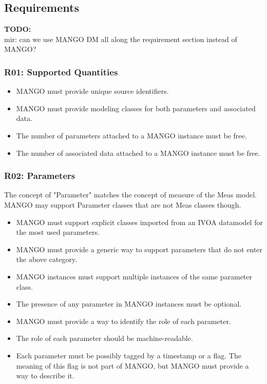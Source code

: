 \documentclass[11pt,a4paper]{ivoa}
\newcommand{\TODO}[1]{%
    \noindent%
    \colorbox{todocolor}{%
            \parbox{0.85\linewidth}{\sffamily \textbf{TODO:}\\
            #1}
    }%
    \vspace{2pt}

}
\begin{document}
\subsection{Requirements}
\TODO{mir: can we use MANGO DM all along the requirement section instead of MANGO?  }

\subsubsection{R01: Supported Quantities}
\begin{itemize}
    \item MANGO must provide unique source identifiers.
    \item MANGO must provide modeling classes for both parameters and associated data.
    \item The number of parameters attached to a MANGO instance must be free.
    \item The number of associated data attached to a MANGO instance must be free.
\end{itemize}

\subsubsection{R02: Parameters}
The concept of "Parameter" matches the concept of measure of the Meas model. MANGO may support Parameter classes that are not Meas classes though.


\begin{itemize}
    \item MANGO must support explicit classes imported from an IVOA datamodel for the most used parameters.
    \item MANGO must provide a generic way to support parameters that do not enter the above category.
    \item MANGO instances must support multiple instances of the same parameter class.
    \item The presence of any parameter in MANGO instances must be optional.
    \item MANGO must provide a way to identify the role of each parameter.
    \item The role of each parameter should be machine-readable.
    \item Each parameter must be possibly tagged by a timestamp or a flag. The meaning of this flag is not part of MANGO, but MANGO must provide a way to describe it.
\end{itemize}
\end{document}
